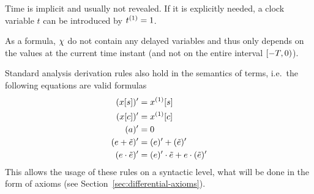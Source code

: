     Time is implicit and usually not revealed. If it is explicitly needed, a clock variable $t$ can be introduced by $\hevolve{\D{t}=1}$.


    
    As a \FOLR formula, $\chi$ do not contain any delayed variables and thus only depends on the values at the current time instant (and not on the entire interval $[-T,0)$).

    \begin{lemma}[Derivatives]\label{lm:derivatives}
        Standard analysis derivation rules also hold in the semantics of \ddL terms, i.e.\ the following equations are valid \ddL formulas
        \begin{align}
            \der{\x[s]} &= \Dx[s]\\
            \der{\x[c]} &= \Dx[c]\\
            \der{a} &= 0\\
            \der{\astrm+\bstrm} &= \der{\astrm}+\der{\bstrm}\\
            \der{\astrm\cdot\bstrm} &= \der{\astrm}\cdot\bstrm + \astrm\cdot\der{\bstrm}\\
        \end{align}
        This allows the usage of these rules on a syntactic level, what will be done in the form of axioms (see Section~\ref{sec:differential-axioms}).
    \end{lemma}
